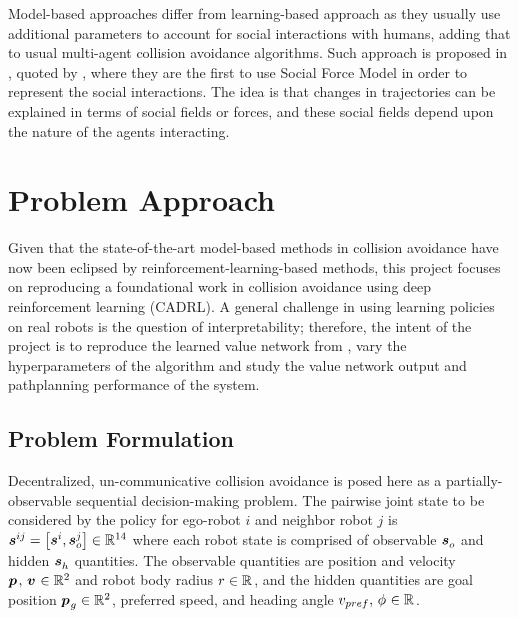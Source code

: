 \documentclass[conference]{IEEEtran}
\begin{document}
Model-based approaches differ from learning-based approach as they usually use additional parameters to account for social interactions with humans, adding that to usual multi-agent collision avoidance algorithms. Such approach is proposed in \cite{Ferrer}, quoted by \cite{SocialCA}, where they are the first to use Social Force Model in order to represent the social interactions. The idea is that changes in trajectories can be explained in terms of social fields or forces, and these social fields depend upon the nature of the agents interacting.

\section{Problem Approach}
Given that the state-of-the-art model-based methods in collision avoidance have now been eclipsed by reinforcement-learning-based methods, this project focuses on reproducing a foundational work in collision avoidance using deep reinforcement learning (CADRL). A general challenge in using learning policies on real robots is the question of interpretability; therefore, the intent of the project is to reproduce the learned value network from \cite{chen2017cadrl}, vary the  hyperparameters of the algorithm and study the value network output and pathplanning performance of the system.

\subsection{Problem Formulation}
Decentralized, un-communicative collision avoidance is posed here as a partially-observable sequential decision-making problem. The pairwise joint state to be considered by the policy for ego-robot $i$ and neighbor robot $j$ is $\boldsymbol{s}^{ij}_{}=\begin{bmatrix} \boldsymbol{s}^{i}_{} , \boldsymbol{s}^{j}_{o} \end{bmatrix}\in \mathbb{R}^{14}$ where each robot state is comprised of observable $\boldsymbol{s}^{}_{o}$ and hidden $\boldsymbol{s}^{}_{h}$ quantities. The observable quantities are position and velocity $\boldsymbol{p_{}}_{}, \,  \boldsymbol{v_{}}_{} \in \mathbb{R}^{2}$ and robot body radius $r_{} \in \mathbb{R}^{}$, and the hidden quantities are goal position $\boldsymbol{p_{}}_{g} \in \mathbb{R}^{2}$, preferred speed, and heading angle $v_{pref}, \, \phi_{}\in \mathbb{R}^{}$.
\end{document}
